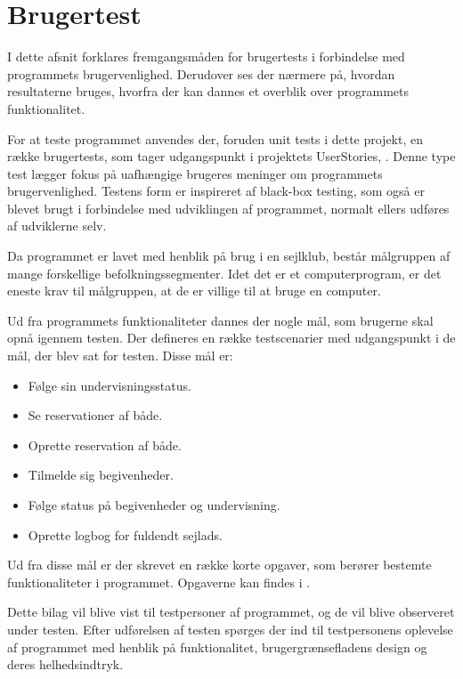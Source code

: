 \section{Brugertest}
I dette afsnit forklares fremgangsmåden for brugertests i forbindelse med programmets brugervenlighed.
Derudover ses der nærmere på, hvordan resultaterne bruges, hvorfra der kan dannes et overblik over programmets funktionalitet. 

For at teste programmet anvendes der, foruden unit tests i dette projekt, en række brugertests, som tager udgangspunkt i projektets UserStories, .
Denne type test lægger fokus på uafhængige brugeres meninger om programmets brugervenlighed.
Testens form er inspireret af black-box testing, som også er blevet brugt i forbindelse med udviklingen af programmet, normalt ellers udføres af udviklerne selv.

Da programmet er lavet med henblik på brug i en sejlklub, består målgruppen af mange forskellige befolkningssegmenter. 
Idet det er et computerprogram, er det eneste krav til målgruppen, at de er villige til at bruge en computer.

Ud fra programmets funktionaliteter dannes der nogle mål, som brugerne skal opnå igennem testen. 
Der defineres en række testscenarier med udgangspunkt i de mål, der blev sat for testen.
Disse mål er:
\begin{itemize}
  \item Følge sin undervisningsstatus.
  \item Se reservationer af både.
  \item Oprette reservation af både.
  \item Tilmelde sig begivenheder.
  \item Følge status på begivenheder og undervisning.
  \item Oprette logbog for fuldendt sejlads.
\end{itemize}

Ud fra disse mål er der skrevet en række korte opgaver, som berører bestemte funktionaliteter i programmet. 
Opgaverne kan findes i .

Dette bilag vil blive vist til testpersoner af programmet, og de vil blive observeret under testen. 
Efter udførelsen af testen spørges der ind til testpersonens oplevelse af programmet med henblik på funktionalitet, brugergrænsefladens design og deres helhedsindtryk.

